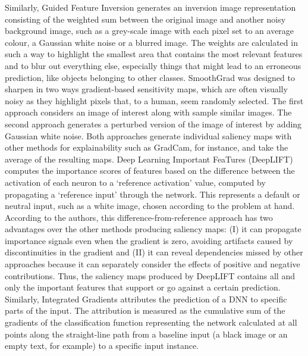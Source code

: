 \documentclass[final,1p,times]{elsarticle}
\begin{document}
Similarly, Guided Feature Inversion \cite{du2018towards} generates an inversion image representation consisting of the weighted sum between the original image and another noisy background image, such as a grey-scale image with each pixel set to an average colour, a Gaussian white noise or a blurred image. The weights are calculated in such a way to highlight the smallest area that contains the most relevant features and to blur out everything else, especially things that might lead to an erroneous prediction, like objects belonging to other classes.
SmoothGrad \cite{smilkov2017smoothgrad} was designed to sharpen in two ways gradient-based sensitivity maps, which are often visually noisy as they highlight pixels that, to a human, seem randomly selected. The first approach considers an image of interest along with sample similar images. The second approach generates a perturbed version of the image of interest by adding Gaussian white noise. Both approaches generate individual saliency maps with other methods for explainability such as GradCam, for instance, and take the average of the resulting maps.
Deep Learning Important FeaTures (DeepLIFT) \cite{shrikumar2017learning} computes the importance scores of features based on the difference between the activation of each neuron to a `reference activation' value, computed by propagating a `reference input' through the network. This represents a default or neutral input, such as a white image, chosen according to the problem at hand. According to the authors, this difference-from-reference approach has two advantages over the other methods producing saliency maps: (I) it can propagate importance signals even when the gradient is zero, avoiding artifacts caused by discontinuities in the gradient and (II) it can reveal dependencies missed by other approaches because it can separately consider the effects of positive and negative contributions. Thus, the saliency maps produced by DeepLIFT contains all and only the important features that support or go against a certain prediction. Similarly, Integrated Gradients \cite{sundararajan2017axiomatic} attributes the prediction of a DNN to specific parts of the input. The attribution is measured as the cumulative sum of the gradients of the classification function representing the network calculated at all points along the straight-line path from a baseline input (a black image or an empty text, for example) to a specific input instance.\\
\end{document}

